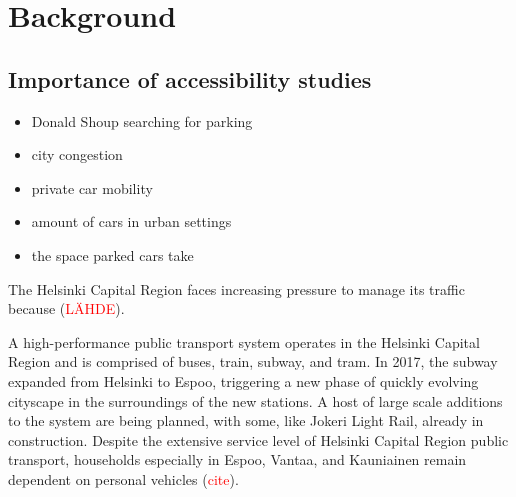 \section{Background}
\subsection{Importance of accessibility studies}
\justify


\begin{itemize}
    \item Donald Shoup searching for parking
    \item city congestion
    \item private car mobility
    \item amount of cars in urban settings
    \item the space parked cars take
\end{itemize}

The Helsinki Capital Region faces increasing pressure to manage its traffic because (\textcolor{red}{LÄHDE}).

A high-performance public transport system operates in the Helsinki Capital Region and is comprised of buses, train, subway, and tram. In 2017, the subway expanded from Helsinki to Espoo, triggering a new phase of quickly evolving cityscape in the surroundings of the new stations. A host of large scale additions to the system are being planned, with some, like Jokeri Light Rail, already in construction. Despite the extensive service level of Helsinki Capital Region public transport, households especially in Espoo, Vantaa, and Kauniainen remain dependent on personal vehicles (\textcolor{red}{cite}).

